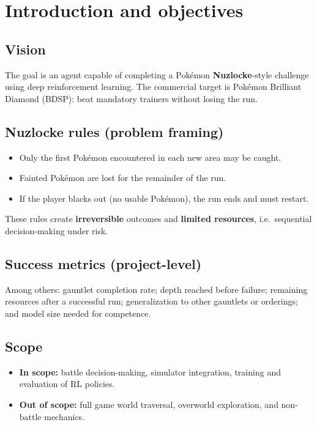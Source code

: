 \chapter{Introduction and objectives}

\section{Vision}
The goal is an agent capable of completing a Pok\'{e}mon \textbf{Nuzlocke}-style challenge using deep reinforcement learning. The commercial target is Pok\'{e}mon Brilliant Diamond (BDSP): beat mandatory trainers without losing the run.

\section{Nuzlocke rules (problem framing)}
\begin{itemize}
  \item Only the first Pok\'{e}mon encountered in each new area may be caught.
  \item Fainted Pok\'{e}mon are lost for the remainder of the run.
  \item If the player blacks out (no usable Pok\'{e}mon), the run ends and must restart.
\end{itemize}
These rules create \textbf{irreversible} outcomes and \textbf{limited resources}, i.e.\ sequential decision-making under risk.

\section{Success metrics (project-level)}
Among others: gauntlet completion rate; depth reached before failure; remaining resources after a successful run; generalization to other gauntlets or orderings; and model size needed for competence.

\section{Scope}
\begin{itemize}
  \item \textbf{In scope:} battle decision-making, simulator integration, training and evaluation of RL policies.
  \item \textbf{Out of scope:} full game world traversal, overworld exploration, and non-battle mechanics.
\end{itemize}
